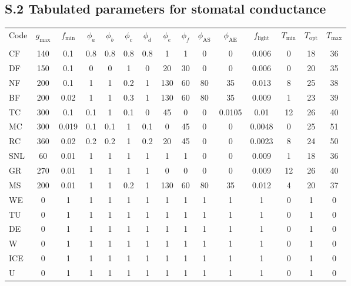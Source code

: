 \documentclass[manuscript]{copernicus}
\begin{document}
\subsection*{S.2 Tabulated parameters for stomatal conductance}
\appendixtables
\begin{sidewaystable}[!htbp]
  \begin{tabular}{lcccccccccccccc}
    \tophline
    Code & $g_\text{max}$ & $f_\text{min}$ & $\phi_a$ & $\phi_b$ & $\phi_c$ & $\phi_d$ & $\phi_e$ & $\phi_f$ & $\phi_\text{AS}$ & $\phi_\text{AE}$ & $f_\text{light}$ & $T_\text{min}$ & $T_\text{opt}$ & $T_\text{max}$ \\
    &&&&&&&&&&&&&&\\
    \middlehline
    CF & 140 & 0.1 & 0.8 & 0.8 & 0.8 & 0.8 & 1 & 1 & 0 & 0 & 0.006 & 0 & 18 & 36  \\
    DF & 150 & 0.1 & 0 & 0 & 1 & 0 & 20 & 30 & 0 & 0 & 0.006 & 0 & 20 & 35  \\
    NF & 200 & 0.1 & 1 & 1 & 0.2 & 1 & 130 & 60 & 80 & 35 & 0.013 & 8 & 25 & 38 \\
    BF & 200 & 0.02 & 1 & 1 & 0.3 & 1 & 130 & 60 & 80 & 35 & 0.009 & 1 & 23 & 39 \\
    TC & 300 & 0.1 & 0.1 & 1 & 0.1 & 0 & 45 & 0 & 0 & 0.0105 & 0.01 & 12 & 26 & 40 \\
    MC & 300 & 0.019 & 0.1 & 0.1 & 1 & 0.1 & 0 & 45 & 0 & 0 & 0.0048 & 0 & 25 & 51  \\
    RC & 360 & 0.02 & 0.2 & 0.2 & 1 & 0.2 & 20 & 45 & 0 & 0 & 0.0023 & 8 & 24 & 50  \\
    SNL & 60 & 0.01 & 1 & 1 & 1 & 1 & 1 & 1 & 0 & 0 & 0.009 & 1 & 18 & 36 \\
    GR & 270 & 0.01 & 1 & 1 & 1 & 1 & 0 & 0 & 0 & 0 & 0.009 & 12 & 26 & 40 \\
    MS & 200 & 0.01 & 1 & 1 & 0.2 & 1 & 130 & 60 & 80 & 35 & 0.012 & 4 & 20 & 37 \\
    WE & 0 & 1 & 1 & 1 & 1 & 1 & 1 & 1 & 1 & 1 & 1 & 0 & 1 & 0 \\
    TU & 0 & 1 & 1 & 1 & 1 & 1 & 1 & 1 & 1 & 1 & 1 & 0 & 1 & 0  \\
    DE & 0 & 1 & 1 & 1 & 1 & 1 & 1 & 1 & 1 & 1 & 1 & 0 & 1 & 0  \\
    W & 0 & 1 & 1 & 1 & 1 & 1 & 1 & 1 & 1 & 1 & 1 & 0 & 1 & 0 \\
    ICE & 0 & 1 & 1 & 1 & 1 & 1 & 1 & 1 & 1 & 1 & 1 & 0 & 1 & 0 \\
    U & 0 & 1 & 1 & 1 & 1 & 1 & 1 & 1 & 1 & 1 & 1 & 0 & 1 & 0 \\

\end{tabular}
\end{sidewaystable}
\end{document}
